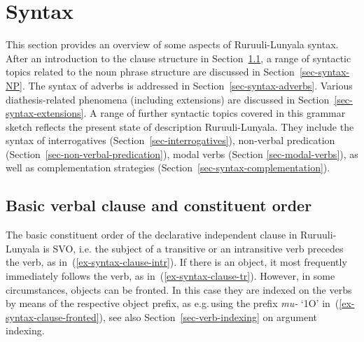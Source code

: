 \chapter{Syntax}

This section provides an overview of some aspects of Ruruuli-Lu\-nya\-la syntax. 
After an introduction to the clause structure in Section~\ref{sec-clause}, a range of syntactic topics related to the noun phrase structure are discussed in Section~\ref{sec-syntax-NP}. 
The syntax of adverbs is addressed in Section~\ref{sec-syntax-adverbs}.  
Various diathesis-related phenomena (including extensions) are discussed in Section~\ref{sec-syntax-extensions}. 
A range of further syntactic topics covered in this grammar sketch reflects the present state of description Ruruuli-Lunyala. 
They include the syntax of interrogatives (Section~\ref{sec-interrogatives}), non-verbal predication (Section~\ref{sec-non-verbal-predication}), modal verbs (Section \ref{sec-modal-verbs}), as well as complementation strategies (Section~\ref{sec-syntax-complementation}). 

\section{Basic verbal clause and constituent order}\label{sec-clause}

The basic constituent order of the declarative independent clause in  Ruruuli-Lunyala  is SVO, i.e. the subject of a transitive or an intransitive verb precedes the verb, as in~(\ref{ex-syntax-clause-intr}).
If there is an object, it most frequently immediately follows the verb, as in~(\ref{ex-syntax-clause-tr}). 
However, in some circumstances, objects can be fronted. 
In this case they are indexed on the verbs by means of the respective object prefix, as e.g.\,using the prefix \emph{mu-} `1O' in~(\ref{ex-syntax-clause-fronted}), see also Section~\ref{sec-verb-indexing} on argument indexing.
	
